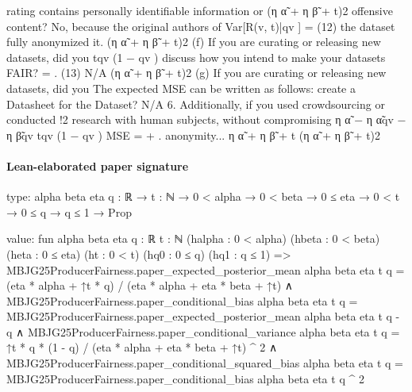 \documentclass[10pt]{article}
\begin{document}
\begin{ReviewVerbatim}
      rating contains personally identifiable information or                                    (η α̃ + η β̃ + t)2
      offensive content? No, because the original authors of                            Var[R(v, t)|qv ]
                                                                                      =                                                       (12)
      the dataset fully anonymized it.                                                  (η α̃ + η β̃ + t)2
  (f) If you are curating or releasing new datasets, did you                              tqv (1 − qv )
      discuss how you intend to make your datasets FAIR?                              =                    .                                  (13)
      N/A                                                                               (η α̃ + η β̃ + t)2
 (g) If you are curating or releasing new datasets, did you                 The expected MSE can be written as follows:
      create a Datasheet for the Dataset? N/A
6. Additionally, if you used crowdsourcing or conducted                                                            !2
   research with human subjects, without compromising                                   η α̃ − η α̃qv − η β̃qv                tqv (1 − qv )
                                                                             MSE =                                      +                      .
   anonymity...                                                                              η α̃ + η β̃ + t                (η α̃ + η β̃ + t)2
\end{ReviewVerbatim}



\paragraph{Lean-elaborated paper signature}
\begin{ReviewVerbatim}
type:
{alpha beta eta q : ℝ} → {t : ℕ} → 0 < alpha → 0 < beta → 0 ≤ eta → 0 < t → 0 ≤ q → q ≤ 1 → Prop

value:
fun {alpha beta eta q : ℝ} {t : ℕ} (halpha : 0 < alpha) (hbeta : 0 < beta) (heta : 0 ≤ eta) (ht : 0 < t) (hq0 : 0 ≤ q)
    (hq1 : q ≤ 1) =>
  MBJG25ProducerFairness.paper_expected_posterior_mean alpha beta eta t q =
      (eta * alpha + ↑t * q) / (eta * alpha + eta * beta + ↑t) ∧
    MBJG25ProducerFairness.paper_conditional_bias alpha beta eta t q =
        MBJG25ProducerFairness.paper_expected_posterior_mean alpha beta eta t q - q ∧
      MBJG25ProducerFairness.paper_conditional_variance alpha beta eta t q =
          ↑t * q * (1 - q) / (eta * alpha + eta * beta + ↑t) ^ 2 ∧
        MBJG25ProducerFairness.paper_conditional_squared_bias alpha beta eta t q =
          MBJG25ProducerFairness.paper_conditional_bias alpha beta eta t q ^ 2
\end{ReviewVerbatim}
\end{document}
